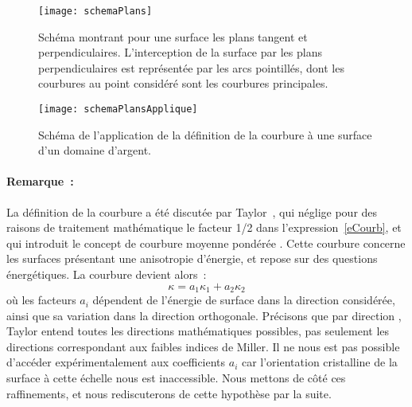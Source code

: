 {{\begin{figure}[!htb]
\centering
\texttt{[image: schemaPlans]}
\caption{Schéma montrant pour une surface les plans tangent et perpendiculaires. L’interception de la surface par les plans perpendiculaires est représentée par les arcs pointillés, dont les courbures au point considéré sont les courbures principales.}
\label{schemaPlans}
\end{figure}
\begin{figure}[!htb]
\centering
\texttt{[image: schemaPlansApplique]}
\caption{Schéma de l'application de la définition de la courbure à une surface d’un domaine d’argent.}
\label{schemaPlansApplique}
\end{figure}

\paragraph*{Remarque~:} La définition de la courbure a été discutée par Taylor~\cite{taylor1992ii}, qui néglige pour des raisons de traitement mathématique le facteur 1/2 dans l’expression~\ref{eCourb}, et qui introduit le concept de \og courbure moyenne pondérée \fg. Cette courbure concerne les surfaces présentant une anisotropie d’énergie, et repose sur des questions énergétiques. La courbure devient alors~:
\begin{equation}
\kappa = a_1\kappa_1+a_2\kappa_2
\end{equation}
où les facteurs $a_i$ dépendent de l’énergie de surface dans la direction considérée, ainsi que sa variation dans la direction orthogonale. Précisons que par \og direction  \fg, Taylor entend toutes les directions mathématiques possibles, pas seulement les directions correspondant aux faibles indices de Miller. Il ne nous est pas possible d'accéder expérimentalement aux coefficients $a_i$ car l'orientation cristalline de la surface à cette échelle nous est inaccessible. Nous mettons de côté ces raffinements, et nous rediscuterons de cette hypothèse par la suite.\par 

}}
